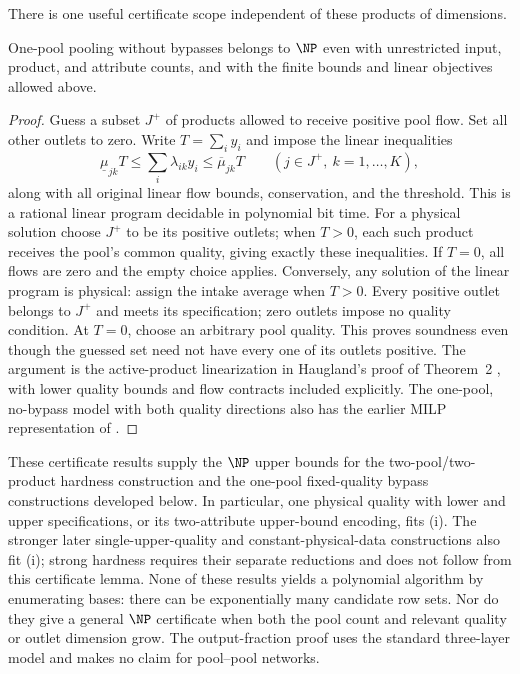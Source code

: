 There is one useful certificate scope independent of these products
of dimensions.
\begin{proposition}\label{s2:no-bypass-np}
One-pool pooling without bypasses belongs to $\NP$ even with
unrestricted input, product, and attribute counts, and with the finite
bounds and linear objectives allowed above.
\end{proposition}
\begin{proof}
Guess a subset $J^+$ of products allowed to receive positive pool flow.
Set all other outlets to zero. Write $T=\sum_i y_i$ and impose the
linear inequalities
\[
 \underline\mu_{jk}T\le\sum_i\lambda_{ik}y_i
   \le\overline\mu_{jk}T\qquad(j\in J^+,\ k=1,\ldots,K),
\]
along with all original linear flow bounds, conservation, and the
threshold. This is a rational linear program decidable in polynomial
bit time. For a physical solution choose $J^+$ to be its positive
outlets; when $T>0$, each such product receives the pool's common
quality, giving exactly these inequalities. If $T=0$, all flows are
zero and the empty choice applies. Conversely, any solution of the
linear program is physical: assign the intake average when $T>0$.
Every positive outlet belongs to $J^+$ and meets its specification;
zero outlets impose no quality condition. At $T=0$, choose an arbitrary
pool quality. This proves soundness even though the guessed set need
not have every one of its outlets positive. The argument is the
active-product linearization in Haugland's proof of Theorem~2
\citep{haugland2016-the-computational-complexity-of-the}, with lower
quality bounds and flow contracts included explicitly.
The one-pool, no-bypass model with both quality directions also has
the earlier MILP representation of
\citet[electronic companion, Appendix~A]{dey2015-analysis-of-milp-techniques-for}.
\end{proof}

These certificate results supply the $\NP$ upper bounds for the
two-pool/two-product hardness construction and the one-pool
fixed-quality bypass constructions developed below. In particular,
one physical quality with lower and upper specifications, or its
two-attribute upper-bound encoding, fits (i). The stronger later
single-upper-quality and constant-physical-data constructions also
fit (i); strong hardness requires their separate reductions and does
not follow from this certificate lemma. None of these results yields
a polynomial algorithm by enumerating bases: there can be
exponentially many candidate row sets. Nor do they give a general
$\NP$ certificate when both the pool count and relevant quality or
outlet dimension grow. The output-fraction proof uses the standard
three-layer model and makes no claim for pool--pool networks.
